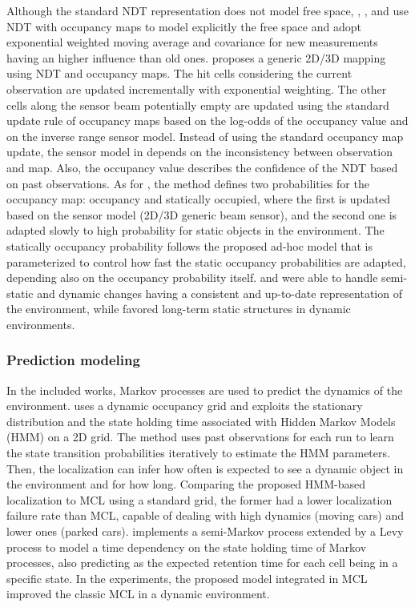 Although the standard NDT representation does not model free space, \cite{einhorn-gross:2013:6698849}, \cite{saarinen-et-al:2013:0278364913499415}, and \cite{einhorn-gross:2015:008} use NDT with occupancy maps to model explicitly the free space and adopt exponential weighted moving average and covariance for new measurements having an higher influence than old ones.
\cite{einhorn-gross:2015:008} proposes a generic 2D/3D mapping using NDT and occupancy maps. The hit cells considering the current observation are updated incrementally with exponential weighting. The other cells along the sensor beam potentially empty are updated using the standard update rule of occupancy maps based on the log-odds of the occupancy value and on the inverse range sensor model.
Instead of using the standard occupancy map update, the sensor model in \cite{saarinen-et-al:2013:0278364913499415} depends on the inconsistency between observation and map. Also, the occupancy value describes the confidence of the NDT based on past observations.
As for \cite{einhorn-gross:2015:008}, the method defines two probabilities for the occupancy map: occupancy and statically occupied, where the first is updated based on the sensor model (2D/3D generic beam sensor), and the second one is adapted slowly to high probability for static objects in the environment. The statically occupancy probability follows the proposed ad-hoc model that is parameterized to control how fast the static occupancy probabilities are adapted, depending also on the occupancy probability itself.
\cite{einhorn-gross:2013:6698849} and \cite{einhorn-gross:2015:008} were able to handle semi-static and dynamic changes having a consistent and up-to-date representation of the environment, while \cite{saarinen-et-al:2013:0278364913499415} favored long-term static structures in dynamic environments.



\subsubsection{Prediction modeling}

In the included works, Markov processes are used to predict the dynamics of the environment.
\cite{tipaldi-et-al:2013:0278364913502830} uses a dynamic occupancy grid and exploits the stationary distribution and the state holding time associated with Hidden Markov Models (HMM) on a 2D grid. The method uses past observations for each run to learn the state transition probabilities iteratively to estimate the HMM parameters. Then, the localization can infer how often is expected to see a dynamic object in the environment and for how long. Comparing the proposed HMM-based localization to MCL using a standard grid, the former had a lower localization failure rate than MCL, capable of dealing with high dynamics (moving cars) and lower ones (parked cars).
\cite{rapp-et-al:2015:77} implements a semi-Markov process extended by a Levy process to model a time dependency on the state holding time of Markov processes, also predicting as \cite{tipaldi-et-al:2013:0278364913502830} the expected retention time for each cell being in a specific state. In the experiments, the proposed model integrated in MCL improved the classic MCL in a dynamic environment.

